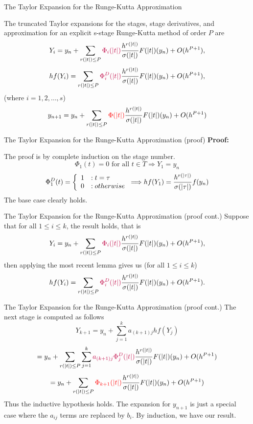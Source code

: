 \documentclass{beamer}
\def \purple{\textcolor{purple}}
\def \red{\textcolor{red}}
\begin{document}
\begin{frame}{The Taylor Expansion for the Runge-Kutta Approximation}
\begin{theorem}
The truncated Taylor expansions for the stages, stage derivatives, and approximation 
for an explicit s-stage Runge-Kutta method of order $P$ are
$$Y_i = y_n + \sum_{r(|t|) \le P}\purple{\Phi_i(|t|)} {\frac{h^{r(|t|)}}{\sigma(|t|)}F(|t|)(y_n)} + O(h^{P + 1}),$$
$$hf(Y_i) = \sum_{r(|t|) \le P}{\purple{\Phi_i^D(|t|)}\frac{h^{r(|t|)}}{\sigma(|t|)}F(|t|)(y_n) } + O(h^{P + 1}),$$
\hfill (where $i = 1, 2, \dots, s$)
$$y_{n + 1} =  y_n + \sum_{r(|t|) \le P}{\red{\Phi(|t|)}\frac{h^{r(|t|)}}{\sigma(|t|)}F(|t|)(y_n)} + O(h^{P + 1})$$
\end{theorem}
\end{frame}

\begin{frame}{The Taylor Expansion for the Runge-Kutta Approximation (proof)}
\textbf{Proof:}

The proof is by complete induction on the stage number.
$$\Phi_1(t) = 0 \mbox{ for all } t \in T \Longrightarrow Y_1 = y_n$$
$$\Phi_1^D(t) = \left\{ 
	\begin{array}{l l}
	1 & : t = \tau \\
	0 & : otherwise
	\end{array}
\right.
\Longrightarrow
hf(Y_1) = \frac{h^{r(|\tau|)}}{\sigma(|\tau|)}f(y_n)$$ \newline
The base case clearly holds.
\end{frame}

\begin{frame}{The Taylor Expansion for the Runge-Kutta Approximation (proof cont.)}
Suppose that for all $1 \le i \le k$, the result holds, that is
$$Y_i = y_n + \sum_{r(|t|) \le P}{\purple{\Phi_i(|t|)}\frac{h^{r(|t|)}}{\sigma(|t|)}F(|t|)(y_n)} + O(h^{P + 1}),$$
then applying the most recent lemma gives us (for all $1 \le i \le k$)
$$hf(Y_i) = \sum_{r(|t|) \le P}{\purple{\Phi_i^D(|t|)}\frac{h^{r(|t|)}}{\sigma(|t|)}F(|t|)(y_n) } + O(h^{P + 1}).$$
\end{frame}
\begin{frame}{The Taylor Expansion for the Runge-Kutta Approximation (proof cont.)}
The next stage is computed as follows
$$Y_{k + 1} = y_n + \sum_{j = 1}^k{a_{(k+1)j}hf(Y_j)}$$ 
$$= y_n + \sum_{r(|t|) \le P}{\sum_{j = 1}^k{\purple{a_{(k+1)j}} {\purple{\Phi_j^D(|t|)} \frac{h^{r(|t|)}}
{\sigma(|t|)}F(|t|)(y_n) } }} + O(h^{P + 1})$$
$$= y_n + \sum_{r(|t|) \le P}{\red{\Phi_{k + 1}(|t|)} \frac{h^{r(|t|)}}{\sigma(|t|)}F(|t|)(y_n)} + O(h^{P + 1})$$
Thus the inductive hypothesis holds. The expansion for $y_{n + 1}$ is just a special case where the $a_{ij}$ terms
are replaced by $b_i$. By induction, we have our result.
\end{frame}
\end{document}
